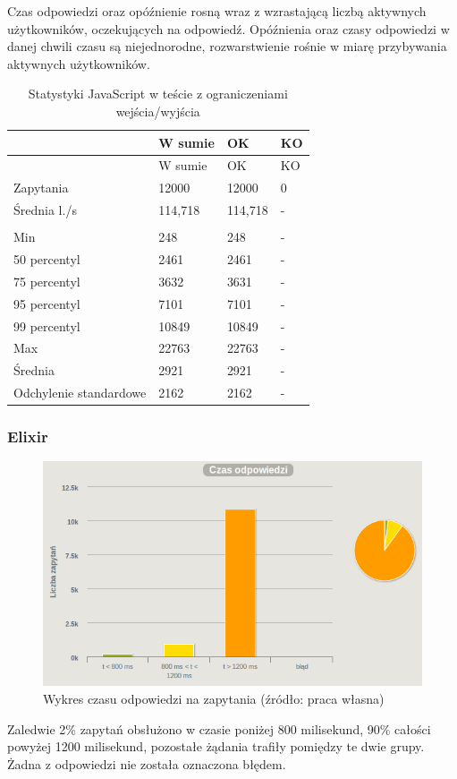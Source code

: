 \documentclass[12pt,twoside]{article}
\begin{document}
Czas odpowiedzi oraz opóźnienie rosną wraz z wzrastającą liczbą
aktywnych użytkowników, oczekujących na odpowiedź. Opóźnienia oraz czasy
odpowiedzi w danej chwili czasu są niejednorodne, rozwarstwienie rośnie
w miarę przybywania aktywnych użytkowników.

\begin{longtable}[c]{@{}llll@{}}
\caption{Statystyki JavaScript w teście z ograniczeniami
wejścia/wyjścia}\tabularnewline
\toprule
& W sumie & OK & KO\tabularnewline
\midrule
\endfirsthead
\toprule
& W sumie & OK & KO\tabularnewline
\midrule
\endhead
Zapytania & 12000 & 12000 & 0\tabularnewline
Średnia l./s & 114,718 & 114,718 & -\tabularnewline
& & &\tabularnewline
Min & 248 & 248 & -\tabularnewline
50 percentyl & 2461 & 2461 & -\tabularnewline
75 percentyl & 3632 & 3631 & -\tabularnewline
95 percentyl & 7101 & 7101 & -\tabularnewline
99 percentyl & 10849 & 10849 & -\tabularnewline
Max & 22763 & 22763 & -\tabularnewline
Średnia & 2921 & 2921 & -\tabularnewline
Odchylenie standardowe & 2162 & 2162 & -\tabularnewline
\bottomrule
\end{longtable}

\clearpage

\subsubsection{Elixir}\label{elixir-3}

\begin{figure}[htbp]
\centering
\includegraphics[resolution=150]{test_results/elixir/file/screenshots/response_times.png}
\caption{Wykres czasu odpowiedzi na zapytania (źródło: praca własna)}
\end{figure}

Zaledwie 2\% zapytań obsłużono w czasie poniżej 800 milisekund, 90\%
całości powyżej 1200 milisekund, pozostałe żądania trafiły pomiędzy te
dwie grupy. Żadna z odpowiedzi nie została oznaczona błędem.
\end{document}
